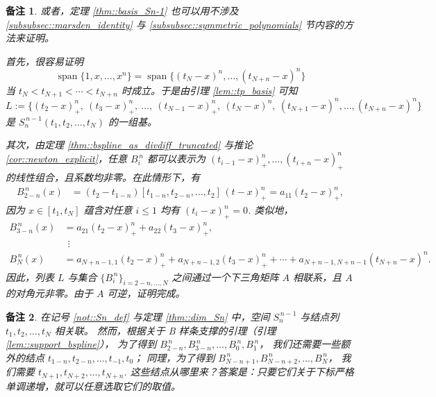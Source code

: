 \documentclass[a4paper]{ctexart}
\newtheorem{remark}{备注}
\numberwithin{theorem}{section}
\numberwithin{equation}{section}
\numberwithin{figure}{section}
\numberwithin{remark}{section}
\begin{document}
\begin{remark}
    \label{rem::alt_proof_basis}
或者，定理 \ref{thm::basis_Sn-1} 也可以用不涉及 \ref{subsubsec::marsden_identity} 与 \ref{subsubsec::symmetric_polynomials} 节内容的方法来证明。

首先，很容易证明
\[
\operatorname{span}\{1,x,\ldots,x^{n}\}
=\operatorname{span}\{(t_{N}-x)^{n},\ldots,(t_{N+n}-x)^{n}\}
\]
当 $t_N<t_{N+1}<\cdots<t_{N+n}$ 时成立。于是由引理 \ref{lem::tp_basis} 可知
\[
L:=\{(t_2-x)^{n}_{+},\ (t_3-x)^{n}_{+},\ \ldots,\ (t_{N-1}-x)^{n}_{+},\ (t_N-x)^{n},\ (t_{N+1}-x)^{n},\ldots,(t_{N+n}-x)^{n}\}
\]
是 $S^{\,n-1}_n(t_1,t_2,\ldots,t_N)$ 的一组基。

其次，由定理 \ref{thm::bspline_as_divdiff_truncated} 与推论 \ref{cor::newton_explicit}，任意 $B^{\,n}_i$ 都可以表示为
$(t_{i-1}-x)^{n}_{+},\ldots,(t_{i+n}-x)^{n}_{+}$ 的线性组合，且系数均非零。在此情形下，有
\[
\begin{aligned}
B^{\,n}_{2-n}(x)
&=(t_2-t_{1-n})[t_{1-n},t_{2-n},\ldots,t_2]\,(t-x)^{n}_{+}
=a_{11}(t_2-x)^{n}_{+},
\end{aligned}
\]
因为 $x\in [t_1,t_N]$ 蕴含对任意 $i\le 1$ 均有 $(t_i-x)^{n}_{+}=0$. 类似地，
\[
\begin{aligned}
B^{\,n}_{3-n}(x)&=a_{21}(t_2-x)^{n}_{+}+a_{22}(t_3-x)^{n}_{+},\\
&\ \ \vdots\\
B^{\,n}_{N}(x)
&=a_{N+n-1,1}(t_2-x)^{n}_{+}+a_{N+n-1,2}(t_3-x)^{n}_{+}
+\cdots+a_{N+n-1,N+n-1}(t_{N+n}-x)^{n}.
\end{aligned}
\]
因此，列表 $L$ 与集合 $\{B^{\,n}_i\}_{i=2-n,\ldots,N}$ 之间通过一个下三角矩阵 $A$ 相联系，且 $A$ 的对角元非零。由于 $A$ 可逆，证明完成。
\end{remark}

\begin{remark}
    \label{rem::extra_knots}
在记号 \ref{not::Sn_def} 与定理 \ref{thm::dim_Sn} 中，空间 $S^{\,n-1}_n$ 与结点列 $t_1,t_2,\ldots,t_N$ 相关联。
然而，根据关于 B 样条支撑的引理（引理 \ref{lem::support_bspline}），
为了得到 $B^{\,n}_{2-n}, B^{\,n}_{3-n},\ldots, B^{\,n}_{0}, B^{\,n}_{1}$，
我们还需要一些额外的结点 $t_{1-n}, t_{2-n},\ldots, t_{-1}, t_0$；
同理，为了得到 $B^{\,n}_{N-n+1}, B^{\,n}_{N-n+2},\ldots, B^{\,n}_{N}$，
我们需要 $t_{N+1}, t_{N+2},\ldots, t_{N+n}$. 
这些结点从哪里来？答案是：只要它们关于下标严格单调递增，就可以任意选取它们的取值。
\end{remark}



\end{document}
